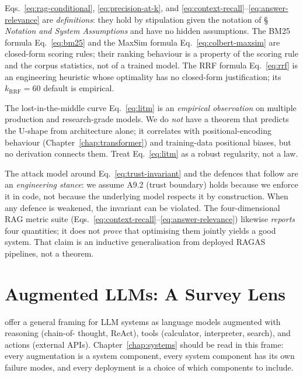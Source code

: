 \begin{provedassumed}
Eqs.~\eqref{eq:rag-conditional}, \eqref{eq:precision-at-k}, and
\eqref{eq:context-recall}--\eqref{eq:answer-relevance} are
\emph{definitions}: they hold by stipulation given the notation of
\S\,\emph{Notation and System Assumptions} and have no hidden
assumptions. The BM25 formula Eq.~\eqref{eq:bm25} and the MaxSim
formula Eq.~\eqref{eq:colbert-maxsim} are closed-form scoring
rules; their ranking behaviour is a property of the scoring rule
and the corpus statistics, not of a trained model. The RRF formula
Eq.~\eqref{eq:rrf} is an engineering heuristic whose optimality
has no closed-form justification; its $k_\mathrm{RRF}=60$ default
is empirical.

The lost-in-the-middle curve Eq.~\eqref{eq:litm} is an
\emph{empirical observation} on multiple production and
research-grade models. We do \emph{not} have a theorem that
predicts the U-shape from architecture alone; it correlates with
positional-encoding behaviour (Chapter~\ref{chap:transformer}) and training-data
positional biases, but no derivation connects them. Treat
Eq.~\eqref{eq:litm} as a robust regularity, not a law.

The attack model around Eq.~\eqref{eq:trust-invariant} and the
defences that follow are an \emph{engineering stance}: we assume
A9.2 (trust boundary) holds because we enforce it in code, not
because the underlying model respects it by construction. When any
defence is weakened, the invariant can be violated. The
four-dimensional RAG metric suite
(Eqs.~\eqref{eq:context-recall}--\eqref{eq:answer-relevance})
likewise \emph{reports} four quantities; it does not \emph{prove}
that optimising them jointly yields a good system. That claim is
an inductive generalisation from deployed RAGAS pipelines, not a
theorem.
\end{provedassumed}

\section{Augmented LLMs: A Survey Lens}

\citet{mialon2023augmented} offer a general framing for LLM
systems as language models augmented with reasoning (chain-of-
thought, ReAct), tools (calculator, interpreter, search), and
actions (external APIs). Chapter~\ref{chap:systems} should be read in this frame:
every augmentation is a system component, every system component
has its own failure modes, and every deployment is a choice of
which components to include.

